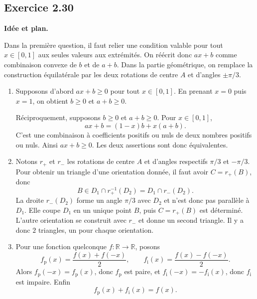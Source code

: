 \documentclass[11pt,a4paper]{article}
\newcommand{\R}{\mathbb R}
\newcommand{\1}{\mathbf 1}
\newenvironment{corrige}[1]{%
  \Needspace{5\baselineskip}%
  \subsection*{Exercice #1}%
  \addcontentsline{toc}{subsection}{Exercice #1}%
}{\medskip}
\newenvironment{methode}{%
  \begin{center}\begin{minipage}{0.94\linewidth}
  \color{MATblue}\textbf{Idée et plan.}\enspace
}{%
  \end{minipage}\end{center}
}
\begin{document}
\begin{corrige}{2.30}
\begin{methode}
Dans la première question, il faut relier une condition valable pour tout $x\in[0,1]$ aux seules valeurs aux extrémités. On réécrit donc $ax+b$ comme combinaison convexe de $b$ et de $a+b$. Dans la partie géométrique, on remplace la construction équilatérale par les deux rotations de centre $A$ et d'angles $\pm\pi/3$.
\end{methode}
\begin{enumerate}
  \item Supposons d'abord $ax+b\geq0$ pour tout $x\in[0,1]$. En prenant $x=0$ puis $x=1$, on obtient $b\geq0$ et $a+b\geq0$.

  Réciproquement, supposons $b\geq0$ et $a+b\geq0$. Pour $x\in[0,1]$,
  \[
  ax+b=(1-x)b+x(a+b).
  \]
  C'est une combinaison à coefficients positifs ou nuls de deux nombres positifs ou nuls. Ainsi $ax+b\geq0$. Les deux assertions sont donc équivalentes.

  \item Notons $r_+$ et $r_-$ les rotations de centre $A$ et d'angles respectifs $\pi/3$ et $-\pi/3$. Pour obtenir un triangle d'une orientation donnée, il faut avoir $C=r_+(B)$, donc
  \[
  B\in D_1\cap r_+^{-1}(D_2)=D_1\cap r_-(D_2).
  \]
  La droite $r_-(D_2)$ forme un angle $\pi/3$ avec $D_2$ et n'est donc pas parallèle à $D_1$. Elle coupe $D_1$ en un unique point $B$, puis $C=r_+(B)$ est déterminé. L'autre orientation se construit avec $r_-$ et donne un second triangle. Il y a donc $\boxed{2}$ triangles, un pour chaque orientation.

  \item Pour une fonction quelconque $f:\R\to\R$, posons
  \[
  f_{\mathrm p}(x)=\frac{f(x)+f(-x)}2,
  \qquad
  f_{\mathrm i}(x)=\frac{f(x)-f(-x)}2.
  \]
  Alors $f_{\mathrm p}(-x)=f_{\mathrm p}(x)$, donc $f_{\mathrm p}$ est paire, et $f_{\mathrm i}(-x)=-f_{\mathrm i}(x)$, donc $f_{\mathrm i}$ est impaire. Enfin
  \[
  f_{\mathrm p}(x)+f_{\mathrm i}(x)=f(x).
  \]
\end{enumerate}
\end{corrige}
\end{document}
